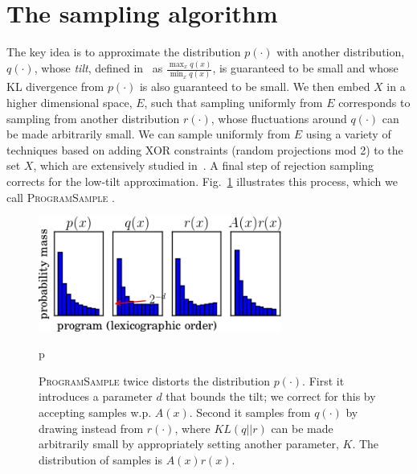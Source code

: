 \documentclass{article}
\newcommand{\theSystem}{\textsc{ProgramSample}}
\begin{document}
\section{The sampling algorithm}
The key idea is to approximate the distribution $p(\cdot )$ with another distribution, $q(\cdot )$, whose \emph{tilt}, defined in~\cite{chakraborty2014distribution} as $\frac{\max_x q(x)}{\min_x q(x)}$, is guaranteed to be small and whose KL divergence from $p(\cdot )$ is also guaranteed to be small.
We then embed $X$ in a higher dimensional space, $E$, such that sampling uniformly from $E$ corresponds to sampling from another distribution $r(\cdot)$, whose fluctuations around $q(\cdot )$ can be made arbitrarily small.
We can sample uniformly from $E$ using a variety of techniques based on adding XOR constraints (random projections mod 2) to the set $X$, which are extensively studied in~\cite{gomes2006near,valiant1985np,chakraborty2014balancing,gomes2006model}.
A final step of rejection sampling corrects for the low-tilt approximation.
Fig.~\ref{cartoon} illustrates this process, which we call \theSystem{} .
\begin{figure}
  \includegraphics[width=8cm]{cartoon_small.png}
  \caption{\theSystem{} twice distorts the distribution $p(\cdot )$. First it introduces a parameter $d$ that bounds the tilt; we correct for this by accepting samples w.p. $A(x)$. Second it samples from $q(\cdot )$ by drawing instead from $r(\cdot )$, where $KL(q||r)$ can be made arbitrarily small by appropriately setting another parameter, $K$. The distribution of samples is $A(x)r(x)$.}\label{cartoon}p
  \end{figure}
\end{document}

